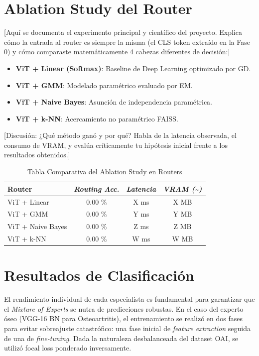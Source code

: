 \documentclass[conference, 11pt]{IEEEtran}
\begin{document}
\section{Ablation Study del Router}
[Aquí se documenta el experimento principal y científico del proyecto. Explica cómo la entrada al router es siempre la misma (el CLS token extraído en la Fase 0) y cómo comparaste matemáticamente 4 cabezas diferentes de decisión:]
\begin{itemize}
    \item \textbf{ViT + Linear (Softmax)}: Baseline de Deep Learning optimizado por GD.
    \item \textbf{ViT + GMM}: Modelado paramétrico evaluado por EM.
    \item \textbf{ViT + Naive Bayes}: Asunción de independencia paramétrica.
    \item \textbf{ViT + k-NN}: Acercamiento no paramétrico FAISS.
\end{itemize}

[Discusión: ¿Qué método ganó y por qué? Habla de la latencia observada, el consumo de VRAM, y evalúa críticamente tu hipótesis inicial frente a los resultados obtenidos.]

\begin{table}[htbp]
\caption{Tabla Comparativa del Ablation Study en Routers}
\begin{center}
\begin{tabular}{|l|c|c|c|}
\hline
\textbf{Router} & \textbf{\textit{Routing Acc.}} & \textbf{\textit{Latencia}} & \textbf{\textit{VRAM (\textasciitilde)}} \\
\hline
ViT + Linear & 0.00 \% & X ms & X MB \\
ViT + GMM & 0.00 \% & Y ms & Y MB \\
ViT + Naive Bayes & 0.00 \% & Z ms & Z MB \\
ViT + k-NN & 0.00 \% & W ms & W MB \\
\hline
\end{tabular}
\label{tab:ablation}
\end{center}
\end{table}

\section{Resultados de Clasificación}
El rendimiento individual de cada especialista es fundamental para garantizar que el \textit{Mixture of Experts} se nutra de predicciones robustas. En el caso del experto óseo (VGG-16 BN para Osteoartritis), el entrenamiento se realizó en dos fases para evitar sobreajuste catastrófico: una fase inicial de \textit{feature extraction} seguida de una de \textit{fine-tuning}. Dada la naturaleza desbalanceada del dataset OAI, se utilizó focal loss ponderado inversamente. 
\end{document}
